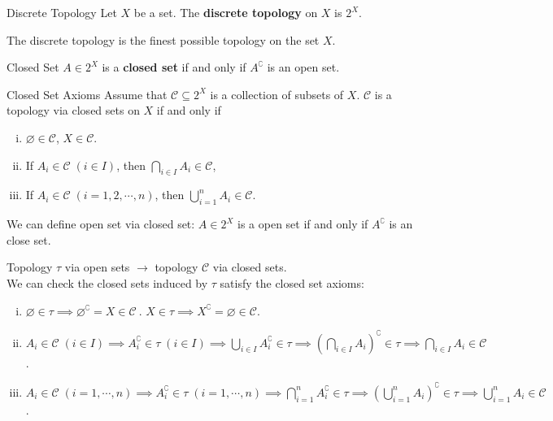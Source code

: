 \documentclass{report}
\begin{document}
\begin{definition}{Discrete Topology}{}
	Let $X$ be a set. The \textbf{discrete topology} on $X$ is $2^X$.
\end{definition}

The discrete topology is the finest possible topology on the set $X$.

\begin{definition}{Closed Set}{}
	$A\in 2^X$ is a \textbf{closed set} if and only if $A^{\complement}$ is an open set.
\end{definition}

\begin{definition}{Closed Set Axioms}{}
	Assume that $\mathcal{C}\subseteq2^X $ is a collection of subsets of $X$. $\mathcal{C}$ is a topology via closed sets on $X$ if and only if
	\begin{enumerate}[(i)]
		\item $\varnothing\in \mathcal{C}$, $X\in \mathcal{C}$.
		\item If $A_i\in\mathcal{C}\;(i\in I)$, then $\bigcap\limits_{i\in I}A_i\in \mathcal{C}$,
		\item If $A_i\in\mathcal{C}\;(i=1,2,\cdots,n)$, then $\bigcup\limits_{i=1}^nA_i\in \mathcal{C}$.
	\end{enumerate}
	We can define open set via closed set: $A\in 2^X$ is a open set if and only if $A^{\complement}$ is an close set.
\end{definition}


\begin{prf}
	Topology $\tau$ via open sets $\rightarrow$ topology $\mathcal{C}$ via closed sets.\\
	We can check the closed sets induced by $\tau$ satisfy the closed set axioms:
	\begin{enumerate}[(i)]
		\item $\varnothing\in \tau\implies\varnothing^{\complement}=X\in \mathcal{C} \ $. $X\in \tau\implies X^{\complement}=\varnothing\in \mathcal{C}$.
		\item $A_i\in\mathcal{C}\;(i\in I)\implies A_i^{\complement}\in\tau\;(i\in I)\implies\bigcup\limits_{i\in I}A_i^{\complement}\in \tau\implies \left(\bigcap\limits_{i\in I}A_i\right)^{\complement}\in \tau\implies\bigcap\limits_{i\in I}A_i\in\mathcal{C}$.
		\item $A_i\in\mathcal{C}\;(i=1,\cdots,n)\implies A_i^{\complement}\in\tau\;(i=1,\cdots,n)\implies\bigcap\limits_{i=1}^nA_i^{\complement}\in \tau\implies \left(\bigcup\limits_{i=1}^nA_i\right)^{\complement}\in \tau\implies\bigcup\limits_{i=1}^nA_i\in\mathcal{C}$.
	\end{enumerate}
\end{prf}
\end{document}
